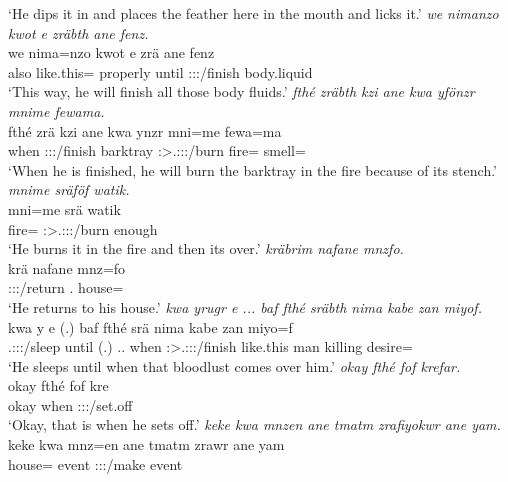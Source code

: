 \begin{exe}
	\trans `He dips it in and places the feather here in the mouth and licks it.'
	\emph{we nimanzo kwot e zräbth ane fenz.}\\
	\gll we nima=nzo kwot e zrä ane fenz\\
	also like.this={\Only} properly until \Stsg:\Sbj:\Irr:\Pfv/finish {\Dem} body.liquid\\
	\trans `This way, he will finish all those body fluids.'
	\emph{fthé zräbth kzi ane kwa yfönzr mnime fewama.}\\
	\gll fthé zrä kzi ane kwa ynzr mni=me fewa=ma\\
	when \Stsg:\Sbj:\Irr:\Pfv/finish barktray {\Dem} {\Fut} \Stsg:\Sbj>\Tsg.\Masc:\Obj:\Nonpast:\Ipfv/burn fire={\Ins} smell=\Char\\
	\trans `When he is finished, he will burn the barktray in the fire because of its stench.'
	\emph{mnime sräföf watik.}\\
	\gll mni=me srä watik\\
	fire={\Ins} \Stsg:\Sbj>\Tsg.\Masc:\Obj:\Irr:\Pfv/burn enough\\
	\trans `He burns it in the fire and then its over.'
	\emph{kräbrim nafane mnzfo.}\\
	\gll krä nafane mnz=fo\\
	\Stsg:\Sbj:\Irr:\Pfv/return \Tsg.{\Poss} house={\Loc}\\
	\trans `He returns to his house.'
	\emph{kwa yrugr e ... baf fthé sräbth nima kabe zan miyof.}\\
	\gll kwa y e (.) baf fthé srä nima kabe zan miyo=f\\
	{\Fut} \Tsg.\Masc:\Sbj:\Nonpast:\Ipfv/sleep until (.) \Recog.\Erg.{\Sg} when \Stsg:\Sbj>\Tsg.\Masc:\Obj:\Irr:\Pfv/finish like.this man killing desire=\Erg\\
	\trans `He sleeps until when that bloodlust comes over him.'
	\emph{okay fthé fof krefar.}\\
	\gll okay fthé fof kre\\
	okay when {\Emph} \Stsg:\Sbj:\Irr:\Pfv/set.off\\
	\trans `Okay, that is when he sets off.'
	\emph{keke kwa mnzen ane tmatm zrafiyokwr ane yam.}\\
	\gll keke kwa mnz=en ane tmatm zrawr ane yam\\
	{\Neg} {\Fut} house={\Loc} {\Dem} event \Stsg:\Sbj:\Irr:\Ipfv/make {\Dem} event\\

\end{exe}
